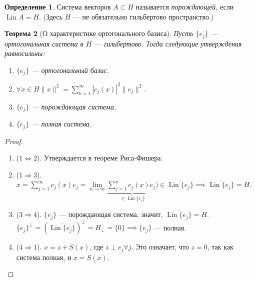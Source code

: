 \documentclass[11pt,openany,a4paper]{scrartcl}
\theoremstyle{plain}
\newtheorem{theorem}{Теорема}[section]
\theoremstyle{definition}
\newtheorem{definition}[theorem]{Определение}
\newcommand\ol{\overline}
\DeclareMathOperator{\Lin}{Lin}
\begin{document}
\begin{definition}
    Система векторов $A \subset H$ называется \emph{порождающей}, если
    $\ol{\Lin A} = H$. (Здесь $H$ — не обязательно гильбертово пространство.)
\end{definition}

\begin{theorem}[О характеристике ортогонального базиса]
    Пусть $\{e_j\}$ — ортогональная система в $H$ — гильбертово.
    Тогда следующие утверждения 
    равносильны:
    \begin{enumerate}
        \item $\{e_j\}$ — ортогональный базис.
        \item $\forall x \in H \|x\|^2 =
        \sum\limits_{k=1}^\infty |c_j(x)|^2\|e_j\|^2$.
        \item $\{e_j\}$ — порождающая система.
        \item $\{e_j\}$ — полная система.
    \end{enumerate}
\end{theorem}
\begin{proof}
\mbox{}
    \begin{enumerate}
        \item ($1 \Leftrightarrow 2$). Утверждается в теореме Риса-Фишера.
        \item ($1 \Rightarrow 3$). $x = \sum\limits_{j=1}^\infty c_j(x)e_j =
        \lim\limits_{n \to \infty}
        \underbrace{\sum\limits_{j=1}^n c_j(x) e_j)}_{\in \Lin \{e_j\}} \in
        \ol{\Lin\{e_j\}} \implies \ol{\Lin \{e_j\}} = H$.
        \item ($3 \Rightarrow 4$). $\{e_j\}$ — порождающая система, значит,
        $\ol{\Lin\{e_j\}} = H$. $\{e_j\}^\perp = (\ol{\Lin\{e_j\}})^\perp =
        H_\perp = \{0\} \implies \{e_j\}$ — полная.
        \item ($4 \Rightarrow 1$). $x = z + S(x)$, где $z \perp e_j \forall j$.
        Это означает, что $z = 0$, так как система полная, и $x = S(x)$.
    \end{enumerate}
\end{proof}
\end{document}
